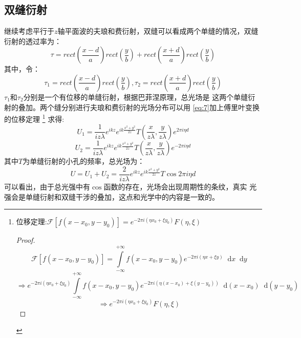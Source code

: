 \documentclass{article}
\newcommand*{\dif}{\mathop{}\!\mathrm{d}}
\begin{document}
\subsection{双缝衍射}
继续考虑平行于$z$轴平面波的夫琅和费衍射，双缝可以看成两个单缝的情况，双缝衍射的透过率为：
\[\tau=rect(\frac{x-d}{a})rect(\frac{y}{b})+rect(\frac{x+d}{a})rect(\frac{y}{b})\]
其中，令：
\[\tau_1=rect(\frac{x-d}{a})rect(\frac{y}{b}),\tau_2=rect(\frac{x+d}{a})rect(\frac{y}{b})\]
$\tau_1$和$\tau_2$分别是一个有位移的单缝衍射，根据巴菲涅原理，总光场是
这两个单缝衍射的叠加。两个缝分别进行夫琅和费衍射的光场分布可以用
\ref{eq:7}加上傅里叶变换的位移定理
\footnote{
  位移定理:$\mathscr{F}[f(x-x_0,y-y_0)]=e^{-2\pi i(\eta x_0+\xi
    y_0)}F(\eta,\xi)$
  \begin{proof}
    \[\mathscr{F}[f(x-x_0,y-y_0)]=\int\limits_{-\infty}^{+\infty}f(x-x_0,y-y_0)e^{-2\pi
        i(\eta x+\xi y)}\dif x\dif y\]
    \[\Rightarrow e^{-2\pi i(\eta x_0+\xi
        y_0)}\int\limits_{-\infty}^{+\infty}f(x-x_0,y-y_0)e^{-2\pi i(\eta
        (x-x_0)+\xi(y-y_0))}\dif(x-x_0)\dif(y-y_0)\]
    \[\Rightarrow e^{-2\pi i(\eta x_0+\xi y_0)}F(\eta,\xi)\]
  \end{proof}

}
求得:
\[U_1=\frac{1}{iz\lambda}e^{ikz}e^{ik
    \frac{x^2+y^2}{2z}}T(\frac{x}{z\lambda},\frac{y}{z\lambda})e^{2\pi
    i\eta d}\]
\[U_2=\frac{1}{iz\lambda}e^{ikz}e^{ik
    \frac{x^2+y^2}{2z}}T(\frac{x}{z\lambda},\frac{y}{z\lambda})e^{-2\pi
    i\eta d}\]
其中$T$为单缝衍射的小孔的频率，总光场为：
\[U=U_1+U_2=\frac{2}{iz\lambda}e^{ikz}e^{ik
    \frac{x^2+y^2}{2z}}T\cos{2\pi i\eta d}\]
可以看出，由于总光强中有$\cos$函数的存在，光场会出现周期性的条纹，真实
光强会是单缝衍射和双缝干涉的叠加，这点和光学中的内容是一致的。
\end{document}
